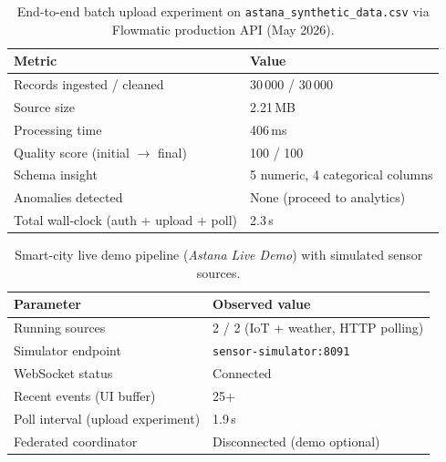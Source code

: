 
\begin{table}[H]
  \centering
  \caption{End-to-end batch upload experiment on \texttt{astana\_synthetic\_data.csv} via Flowmatic production API (May 2026).}
  \label{tab:upload-pipeline-experiment}
  \begin{tabular}{@{}ll@{}}
    \toprule
    \textbf{Metric} & \textbf{Value} \\
    \midrule
    Records ingested / cleaned & 30\,000 / 30\,000 \\
    Source size & 2.21\,MB \\
    Processing time & 406\,ms \\
    Quality score (initial $\rightarrow$ final) & 100 / 100 \\
    Schema insight & 5 numeric, 4 categorical columns \\
    Anomalies detected & None (proceed to analytics) \\
    Total wall-clock (auth + upload + poll) & 2.3\,s \\
    \bottomrule
  \end{tabular}
\end{table}

\begin{table}[H]
  \centering
  \caption{Smart-city live demo pipeline (\emph{Astana Live Demo}) with simulated sensor sources.}
  \label{tab:smart-city-live-demo}
  \begin{tabular}{@{}ll@{}}
    \toprule
    \textbf{Parameter} & \textbf{Observed value} \\
    \midrule
    Running sources & 2 / 2 (IoT + weather, HTTP polling) \\
    Simulator endpoint & \texttt{sensor-simulator:8091} \\
    WebSocket status & Connected \\
    Recent events (UI buffer) & 25+ \\
    Poll interval (upload experiment) & 1.9\,s \\
    Federated coordinator & Disconnected (demo optional) \\
    \bottomrule
  \end{tabular}
\end{table}

